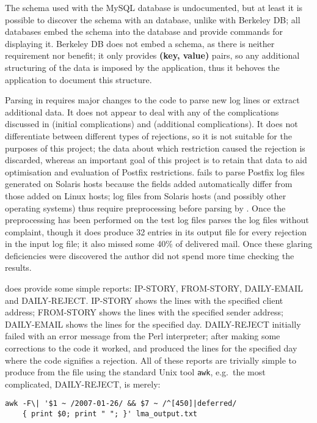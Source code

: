 The schema used with the MySQL database is undocumented, but at least it is
possible to discover the schema with an \SQL{} database, unlike with
Berkeley DB\@; all \SQL{} databases embed the schema into the database and
provide commands for displaying it.  Berkeley DB does not embed a schema,
as there is neither requirement nor benefit; it only provides \textbf{(key,
value)} pairs, so any additional structuring of the data is imposed by the
application, thus it behoves the application to document this structure.

Parsing in \LMA{} requires major changes to the code to parse new log lines
or extract additional data.  It does not appear to deal with any of the
complications discussed in  (initial
complications) and  (additional
complications).  It does not differentiate between different types of
rejections, so it is not suitable for the purposes of this project; the
data about which restriction caused the rejection is discarded, whereas an
important goal of this project is to retain that data to aid optimisation
and evaluation of Postfix restrictions.  \LMA{} fails to parse Postfix log
files generated on Solaris hosts because the fields added automatically
differ from those added on Linux hosts; log files from Solaris hosts (and
possibly other operating systems) thus require preprocessing before parsing
by \LMA{}.  Once the preprocessing has been performed on the
\numberOFlogFILES{} test log files \LMA{} parses the log files without
complaint, though it does produce 32 entries in its output file for every
rejection in the input log file; it also missed some 40\% of delivered
mail.  Once these glaring deficiencies were discovered the author did not
spend more time checking the results.

\LMA{} does provide some simple reports: IP-STORY, FROM-STORY, DAILY-EMAIL
and DAILY-REJECT\@.  IP-STORY shows the \CSV{} lines with the specified
client \IP{} address; FROM-STORY shows the \CSV{} lines with the specified
sender address; DAILY-EMAIL shows the \CSV{} lines for the specified day.
DAILY-REJECT initially failed with an error message from the Perl
interpreter; after making some corrections to the code it worked, and
produced the \CSV{} lines for the specified day where the \SMTP{} code
signifies a rejection.  All of these reports are trivially simple to
produce from the \CSV{} file using the standard Unix tool \texttt{awk},
e.g.\ the most complicated, DAILY-REJECT, is merely:

\begin{verbatim}
awk -F\| '$1 ~ /2007-01-26/ && $7 ~ /^[450]|deferred/
    { print $0; print " "; }' lma_output.txt
\end{verbatim}


